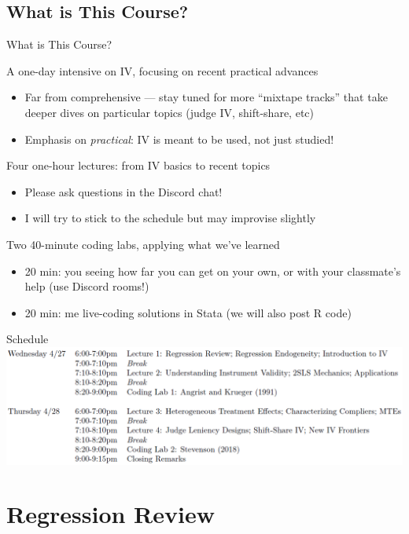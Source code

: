 \documentclass{beamer}
\begin{document}
\subsection{What is This Course?}
\begin{frame}{What is This Course?}

A one-day intensive on IV, focusing on recent practical advances \pause

\begin{itemize}
  \item Far from comprehensive --- stay tuned for more ``mixtape tracks'' that take deeper dives on particular topics (judge IV, shift-share, etc)
  \item Emphasis on \emph{practical}: IV is meant to be used, not just studied!
\end{itemize}\pause\medskip

Four one-hour lectures: from IV basics to recent topics

\begin{itemize}
  \item Please ask questions in the Discord chat!
  \item I will try to stick to the schedule but may improvise slightly
\end{itemize}\pause\medskip

Two 40-minute coding labs, applying what we've learned
\begin{itemize}
  \item 20 min: you seeing how far you can get on your own, or with your classmate's help (use Discord rooms!)
  \item 20 min: me live-coding solutions in Stata (we will also post R code)
\end{itemize}

\end{frame}

\begin{frame}{Schedule}
\includegraphics[scale=0.4]{./lecture_includes/schedule.png}
\end{frame}

\section{Regression Review}
\end{document}
